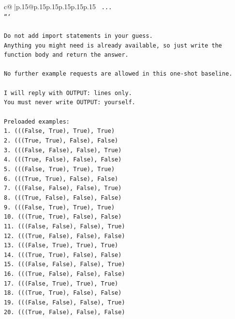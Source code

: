 \documentclass{article}
\begin{document}
{\begin{supertabular}{c@{$\;$}|p{.15\linewidth}@{}p{.15\linewidth}p{.15\linewidth}p{.15\linewidth}p{.15\linewidth}p{.15\linewidth}}
{{{\texttt{    ...} \\
\texttt{```} \\
\\ 
\texttt{Do not add import statements in your guess.} \\
\texttt{Anything you might need is already available, so just write the function body and return the answer.} \\
\\ 
\texttt{No further example requests are allowed in this one{-}shot baseline.} \\
\\ 
\texttt{I will reply with OUTPUT: lines only.} \\
\texttt{You must never write OUTPUT: yourself.} \\
\\ 
\texttt{Preloaded examples:} \\
\texttt{1. (((False, True), True), True)} \\
\texttt{2. (((True, True), False), False)} \\
\texttt{3. (((False, False), False), True)} \\
\texttt{4. (((True, False), False), False)} \\
\texttt{5. (((False, True), True), True)} \\
\texttt{6. (((True, True), False), False)} \\
\texttt{7. (((False, False), False), True)} \\
\texttt{8. (((True, False), False), False)} \\
\texttt{9. (((False, True), True), True)} \\
\texttt{10. (((True, True), False), False)} \\
\texttt{11. (((False, False), False), True)} \\
\texttt{12. (((True, False), False), False)} \\
\texttt{13. (((False, True), True), True)} \\
\texttt{14. (((True, True), False), False)} \\
\texttt{15. (((False, False), False), True)} \\
\texttt{16. (((True, False), False), False)} \\
\texttt{17. (((False, True), True), True)} \\
\texttt{18. (((True, True), False), False)} \\
\texttt{19. (((False, False), False), True)} \\
\texttt{20. (((True, False), False), False)} \\
}}}
\end{supertabular}}
\end{document}
